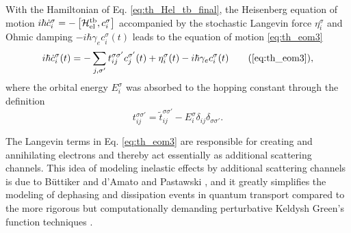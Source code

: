 With the Hamiltonian of Eq. \eqref{eq:th_Hel_tb_final}, the Heisenberg equation of motion $i\hbar \dot{c}_i^{\sigma} = - \left[\mathcal{H}_{\textrm{el}}^{\textrm{tb}},c_i^{\sigma} \right]$ \cite{ballentine} accompanied by the stochastic Langevin force $\eta_i^{\sigma}$ and Ohmic damping $-i\hbar \gamma_e c_i^{\sigma}(t)$ \cite{dhar03} leads to the equation of motion \eqref{eq:th_eom3} 
\begin{equation}
 i\hbar \dot{c}_i^{\sigma}(t) = -\sum_{j,\sigma'} t_{ij}^{\sigma\sigma'} c_j^{\sigma'}(t) +\eta_i^{\sigma}(t) - i\hbar \gamma_e c_i^{\sigma}(t) \tag{\ref{eq:th_eom3}},
\end{equation}
where the orbital energy $E_i^{\sigma}$ was absorbed to the hopping constant through the definition 
\begin{equation}
 t_{ij}^{\sigma\sigma'}=\tilde t_{ij}^{\sigma\sigma'}-E_{i}^{\sigma}\delta_{ij}\delta_{\sigma\sigma'}.
\end{equation}


The Langevin terms in Eq. \eqref{eq:th_eom3} are responsible for creating and annihilating electrons and thereby act essentially as additional scattering channels. This idea of modeling inelastic effects by additional scattering channels is due to B\"uttiker \cite{buttiker86} and d'Amato and Pastawski \cite{damato90}, and it greatly simplifies the modeling of dephasing and dissipation events in quantum transport compared to the more rigorous but computationally demanding perturbative Keldysh Green's function techniques \cite{haugjauho}. %

